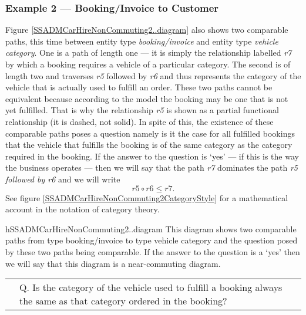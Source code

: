 \subsubsection{Example 2 --- Booking/Invoice to Customer}
\mynote
Figure \ref{SSADMCarHireNonCommuting2..diagram} also shows two comparable paths, this time  between entity type \textit{booking/invoice} and
entity type \textit{vehicle category}. One is a path of length one --- it is simply the relationship labelled \textit{r7} by which a booking requires a vehicle of a particular category.
The second is of length two and traverses \textit{r5} followed by \textit{r6} and thus represents the category of the vehicle that is actually used to fulfill an order. These two paths cannot be equivalent because according to the model the booking may be one that is not yet fulfilled. That is why the relationship \textit{r5} is shown as a partial functional relationship (it is dashed, not solid). 
In spite of this, the existence of these comparable paths poses a question
namely is it the case for all fulfilled bookings that the vehicle that fulfills the booking is of the same category as the category required in the booking. If the answer to the question is `yes' --- if this is the way the business operates --- then we will say that the path \textit{r7} dominates the path \textit{r5 followed by r6} and we will write 
\begin{equation*}
r5 \circ r6 \leq r7.
\end{equation*} 
See figure \ref{SSADMCarHireNonCommuting2CategoryStyle} for a mathematical account in the notation of category theory.

\begin{erboxedFigure}{h}{SSADMCarHireNonCommuting2..diagram}
{
This diagram  shows two comparable paths from type booking/invoice to type vehicle category and the question posed by these two paths being comparable. 
If the answer to the question is a `yes' then we will say that this diagram is a near-commuting diagram.}
\begin{tabular}{c  p{4.0cm}}
\raisebox{-1.8cm}{\scalebox{0.9}
{}}
&
Q. Is the category of the vehicle used to fulfill a booking always
the same as that category ordered in the booking?\\[0.2cm]
\end{tabular} 
\end{erboxedFigure}



